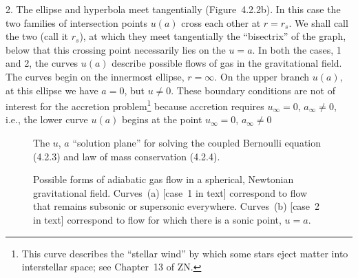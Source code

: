 2. The ellipse and hyperbola meet tangentially (Figure~4.2.2b). In this case the two
families of intersection points $u(a)$ cross each other at $r = r_s$. We shall call the two
(call it $r_s$), at which they meet tangentially the ``bisectrix'' of the graph,
below that this crossing point necessarily lies on the
$u = a$. In both the cases, 1 and 2, the curves $u(a)$ describe possible flows of gas
in the gravitational field. The curves begin on the innermost ellipse, $r = \infty$. On
the upper branch $u(a)$, at this ellipse we have $a = 0$, but $u \neq 0$. These boundary
conditions are not of interest for the accretion problem\footnote{This curve describes the ``stellar wind'' by which some stars eject matter into interstellar
space; see Chapter~13 of ZN.} because accretion
requires $u_\infty = 0$, $a_\infty \neq 0$, i.e., the lower curve $u(a)$ begins at the point $u_\infty = 0$, $a_\infty \neq 0$

\begin{figure}[htbp]
\centering
\caption{The $u$, $a$ ``solution plane'' for solving the coupled Bernoulli equation (4.2.3) and law of mass conservation (4.2.4).}
\label{fig:4.2.1}
\end{figure}

\begin{figure}[htbp]
\centering
\caption{Possible forms of adiabatic gas flow in a spherical, Newtonian gravitational
field. Curves~(a) [case~1 in text] correspond to flow that remains subsonic or supersonic
everywhere. Curves~(b) [case~2 in text] correspond to flow for which there is a sonic point,
$u = a$.}
\label{fig:4.2.2}
\end{figure}
